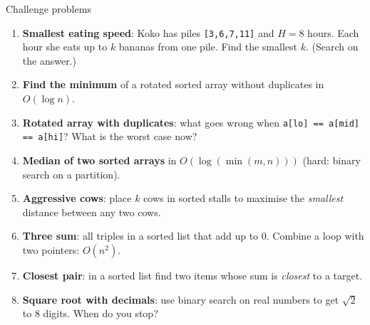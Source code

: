 \documentclass[aspectratio=169,10pt]{beamer}
\begin{document}
\begin{frame}{Challenge problems}
\begin{enumerate}\setlength\itemsep{3pt}\small
\item \textbf{Smallest eating speed}: Koko has piles \texttt{[3,6,7,11]} and $H=8$ hours. Each hour she eats up to $k$ bananas from one pile. Find the smallest $k$. (Search on the answer.)
\item \textbf{Find the minimum} of a rotated sorted array without duplicates in $O(\log n)$.
\item \textbf{Rotated array with duplicates}: what goes wrong when \texttt{a[lo] == a[mid] == a[hi]}? What is the worst case now?
\item \textbf{Median of two sorted arrays} in $O(\log(\min(m,n)))$ (hard: binary search on a partition).
\item \textbf{Aggressive cows}: place $k$ cows in sorted stalls to maximise the \emph{smallest} distance between any two cows.
\item \textbf{Three sum}: all triples in a sorted list that add up to 0. Combine a loop with two pointers: $O(n^2)$.
\item \textbf{Closest pair}: in a sorted list find two items whose sum is \emph{closest} to a target.
\item \textbf{Square root with decimals}: use binary search on real numbers to get $\sqrt 2$ to 8 digits. When do you stop?
\end{enumerate}
\end{frame}
\end{document}
